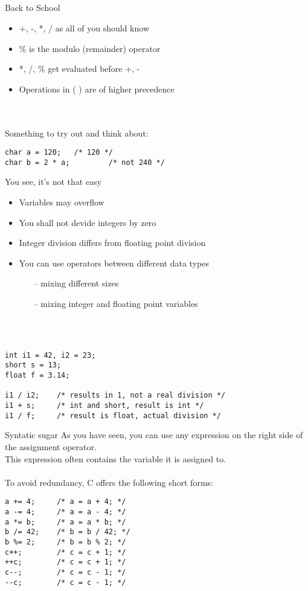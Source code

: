 \subsection{}
\begin{frame}[fragile]{Back to School}
	\begin{itemize}
		\item +, -, *, / as all of you should know
		\item \% is the modulo (remainder) operator
		\item *, /, \% get evaluated before +, -
		\item Operations in (  ) are of higher precedence
	\end{itemize}
	\ \\\ \\Something to try out and think about:
	\begin{lstlisting}[numbers=none]
char a = 120;	/* 120 */
char b = 2 * a;			/* not 240 */
\end{lstlisting}
\end{frame}
\begin{frame}[fragile]{You see, it's not that easy}
	\begin{itemize}
		\item Variables may overflow
		\item You shall not devide integers by zero
		\item Integer division differs from floating point division
		\item You can use operators between different data types
		\begin{itemize}
			\item[--] mixing different sizes
			\item[--] mixing integer and floating point variables
		\end{itemize}
	\end{itemize}
	\ \\\ \\
	\begin{lstlisting}[numbers=none]
int i1 = 42, i2 = 23;
short s = 13;
float f = 3.14;

i1 / i2;	/* results in 1, not a real division */
i1 + s;		/* int and short, result is int */
i1 / f;		/* result is float, actual division */
\end{lstlisting}
\end{frame}
\begin{frame}[fragile]{Syntatic sugar}
	As you have seen, you can use any expression on the right side of the assignment operator.\\
	This expression often contains the variable it is assigned to.\\\ \\
	To avoid redundancy, C offers the following short forms:\\
	\begin{lstlisting}[numbers=none]
a += 4;		/* a = a + 4; */
a -= 4;		/* a = a - 4; */
a *= b;		/* a = a * b; */
b /= 42;	/* b = b / 42; */
b %= 2;		/* b = b % 2; */
c++;		/* c = c + 1; */
++c;		/* c = c + 1; */
c--;		/* c = c - 1; */
--c;		/* c = c - 1; */
\end{lstlisting}
\end{frame}
